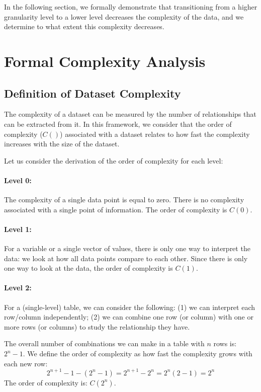 \documentclass[12pt,a4paper]{article}
\begin{document}
In the following section, we formally demonstrate that transitioning from a higher granularity level to a lower level decreases the complexity of the data, and we determine to what extent this complexity decreases.

\section{Formal Complexity Analysis}
\label{sec:complexity}

\subsection{Definition of Dataset Complexity}

The complexity of a dataset can be measured by the number of relationships that can be extracted from it. In this framework, we consider that the order of complexity ($C()$) associated with a dataset relates to how fast the complexity increases with the size of the dataset.

Let us consider the derivation of the order of complexity for each level:

\paragraph{Level 0:}
The complexity of a single data point is equal to zero. There is no complexity associated with a single point of information. The order of complexity is $C(0)$.

\paragraph{Level 1:}
For a variable or a single vector of values, there is only one way to interpret the data: we look at how all data points compare to each other. Since there is only one way to look at the data, the order of complexity is $C(1)$.

\paragraph{Level 2:}
For a (single-level) table, we can consider the following: (1) we can interpret each row/column independently; (2) we can combine one row (or column) with one or more rows (or columns) to study the relationship they have.

The overall number of combinations we can make in a table with $n$ rows is: $2^n - 1$. We define the order of complexity as how fast the complexity grows with each new row:
\begin{equation}
2^{n+1} - 1 - (2^n - 1) = 2^{n+1} - 2^n = 2^n (2 - 1) = 2^n
\end{equation}
The order of complexity is: $C(2^n)$.
\end{document}
